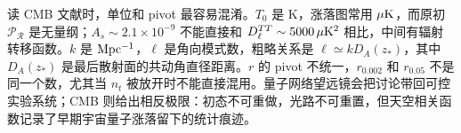 读 CMB 文献时，单位和 pivot 最容易混淆。\(T_0\) 是 K，涨落图常用 \(\mu{\rm K}\)，而原初 \(\mathcal P_{\mathcal R}\) 是无量纲；\(A_s\sim2.1\times10^{-9}\) 不能直接和 \(D_\ell^{TT}\sim5000\,\mu{\rm K}^2\) 相比，中间有辐射转移函数。\(k\) 是 \({\rm Mpc^{-1}}\)，\(\ell\) 是角向模式数，粗略关系是 \(\ell\simeq kD_A(z_*)\)，其中 \(D_A(z_*)\) 是最后散射面的共动角直径距离。\(r\) 的 pivot 不统一，\(r_{0.002}\) 和 \(r_{0.05}\) 不是同一个数，尤其当 \(n_t\) 被放开时不能直接混用。量子网络望远镜会把讨论带回可控实验系统；CMB 则给出相反极限：初态不可重做，光路不可重置，但天空相关函数记录了早期宇宙量子涨落留下的统计痕迹。

